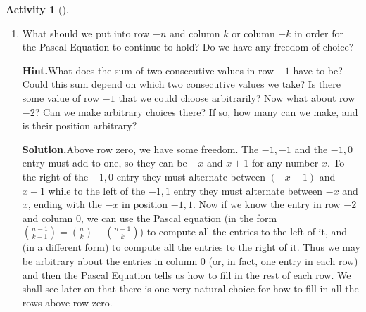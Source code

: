 \documentclass[10pt,]{book}
\theoremstyle{plain}
\theoremstyle{definition}
\newtheorem{activity}[project]{Activity}
\numberwithin{equation}{chapter}
\begin{document}
\begin{activity}[]
\begin{enumerate}[label=(\alph*)]
~\par
\item What should we put into row \(-n\) and column \(k\) or column \(-k\) in order for the Pascal Equation to continue to hold?  Do we have any freedom of choice?%
\par\medskip\noindent%
\textbf{Hint.}\quad What does the sum of two consecutive values in row \(-1\) have to be? Could this sum depend on which two consecutive values we take? Is there some value of row \(-1\) that we could choose arbitrarily? Now what about row \(-2\)? Can we make arbitrary choices there? If so, how many can we make, and is their position arbitrary?\par\medskip\noindent%
\textbf{Solution.}\quad Above row zero, we have some freedom. The \(-1,-1\) and the \(-1,0 \)entry must add to one, so they can be \(-x\) and \(x+1\) for any number \(x\). To the right of the \(-1,0\) entry they must alternate between \((-x-1)\) and \(x+1\) while to the left of the \(-1,1\) entry they must alternate between \(-x\) and \(x\), ending with the \(-x\) in position \(-1,1\). Now if we know the entry in row \(-2\) and column 0, we can use the Pascal equation (in the form \({n-1\choose k-1} = {n\choose k} - {n-1\choose k}\)) to compute all the entries to the left of it, and (in a different form) to compute all the entries to the right of it. Thus we may be arbitrary about the entries in column 0 (or, in fact, one entry in each row) and then the Pascal Equation tells us how to fill in the rest of each row. We shall see later on that there is one very natural choice for how to fill in all the rows above row zero.%

\end{enumerate}
\end{activity}
\end{document}
